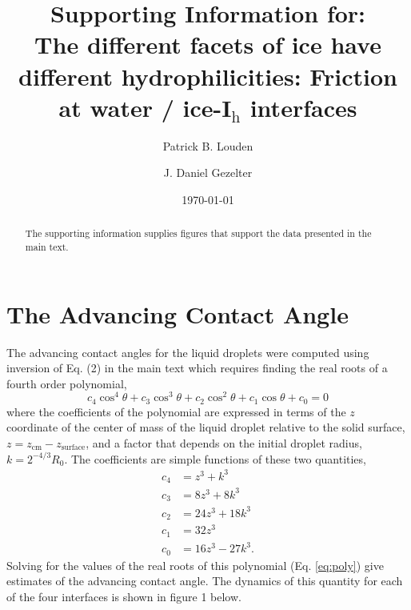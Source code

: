 \documentclass[aps,jcp,preprint,showpacs,superscriptaddress,groupedaddress]{revtex4}  %
\begin{document}
\title{Supporting Information for: \\
The different facets of ice have different hydrophilicities: Friction at water /
  ice-I$_\mathrm{h}$ interfaces}

\author{Patrick B. Louden}
\author{J. Daniel Gezelter}

\date{\today}

\begin{abstract}
The supporting information supplies figures that support the data
presented in the main text.
\end{abstract}



\maketitle

\section{The Advancing Contact Angle}
The advancing contact angles for the liquid droplets were computed
using inversion of Eq. (2) in the main text which requires finding the
real roots of a fourth order polynomial,
\begin{equation}
\label{eq:poly}
c_4 \cos^4 \theta + c_3 \cos^3 \theta + c_2 \cos^2 \theta + c_1
\cos \theta + c_0 = 0
\end{equation}
where the coefficients of the polynomial are expressed in terms of the
$z$ coordinate of the center of mass of the liquid droplet relative to
the solid surface, $z = z_\mathrm{cm} - z_\mathrm{surface}$, and a
factor that depends on the initial droplet radius, $k = 2^{-4/3} R_0$.
The coefficients are simple functions of these two quantities,
\begin{align}
c_4 &= z^3 + k^3 \\
c_3 &= 8 z^3 + 8 k^3 \\
c_2 &= 24 z^3 + 18 k^3 \\
c_1 &= 32 z^3 \\
c_0 &= 16 z^3 - 27 k^3 .
\end{align}
Solving for the values of the real roots of this polynomial
(Eq. \ref{eq:poly}) give estimates of the advancing contact angle.
The dynamics of this quantity for each of the four interfaces is shown
in figure 1 below.
\end{document}
